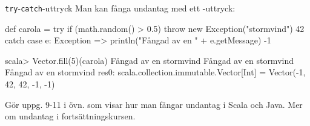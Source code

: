 

\begin{Slide}{\texttt{try}-\texttt{catch}-uttryck}\SlideFontSmall
Man kan fånga undantag med ett -uttryck:
\begin{Code}
def carola = try {
  if (math.random() > 0.5) throw new Exception("stormvind")
  42
} catch {
  case e: Exception =>
    println("Fångad av en " + e.getMessage)
    -1
}
\end{Code}
\pause
\begin{REPL}
scala> Vector.fill(5)(carola)
Fångad av en stormvind
Fångad av en stormvind
Fångad av en stormvind
res0: scala.collection.immutable.Vector[Int] = Vector(-1, 42, 42, -1, -1)
\end{REPL}
Gör uppg. 9-11 i övn.  som visar hur man fångar undantag i Scala och Java. Mer om undantag i fortsättningskursen.
\end{Slide}
